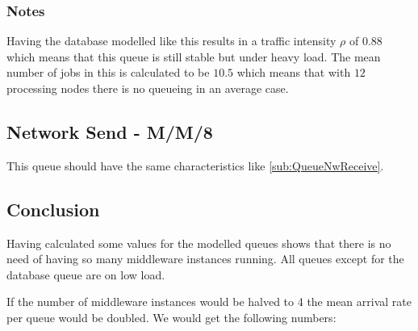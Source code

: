 \documentclass[a4paper]{article}
\begin{document}
\subsubsection{Notes}
Having the database modelled like this results in a traffic intensity $\rho$ of $0.88$ which means that this queue is still stable but under heavy load. The mean number of jobs in this is calculated to be $10.5$ which means that with $12$ processing nodes there is no queueing in an average case.


\subsection{Network Send - M/M/8}
This queue should have the same characteristics like \ref{sub:QueueNwReceive}.


\subsection{Conclusion}

Having calculated some values for the modelled queues shows that there is no need of having so many middleware instances running. All queues except for the database queue are on low load.

If the number of middleware instances would be halved to 4 the mean arrival rate per queue would be doubled. We would get the following numbers:




\end{document}
